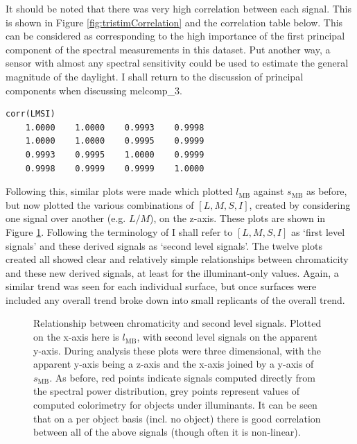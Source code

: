 It should be noted that there was very high correlation between each signal. This is shown in Figure \ref{fig:tristimCorrelation} and the correlation table below. This can be considered as corresponding to the high importance of the first principal component of the spectral measurements in this dataset. Put another way, a sensor with almost any spectral sensitivity could be used to estimate the general magnitude of the daylight. I shall return to the discussion of principal components when discussing melcomp\_3.

\begin{minipage}{\linewidth}
\begin{lstlisting}
corr(LMSI)
    1.0000    1.0000    0.9993    0.9998
    1.0000    1.0000    0.9995    0.9999
    0.9993    0.9995    1.0000    0.9999
    0.9998    0.9999    0.9999    1.0000
\end{lstlisting}
\end{minipage}

\bigskip

Following this, similar plots were made which plotted $l_{\text{MB}}$ against $s_{\text{MB}}$ as before, but now plotted the various combinations of $[L,M,S,I]$, created by considering one signal over another (e.g. $L/M$), on the z-axis. These plots are shown in Figure \ref{fig:allComboSignals}. Following the terminology of \citet{barrionuevo_contributions_2014} I shall refer to $[L,M,S,I]$ as `first level signals' and these derived signals as `second level signals'. The twelve plots created all showed clear and relatively simple relationships between chromaticity and these new derived signals, at least for the illuminant-only values. Again, a similar trend was seen for each individual surface, but once surfaces were included any overall trend broke down into small replicants of the overall trend.

\clearpage

\begin{figure}[h!]
    \caption{Relationship between chromaticity and second level signals. Plotted on the x-axis here is $l_{\text{MB}}$, with second level signals on the apparent y-axis. During analysis these plots were three dimensional, with the apparent y-axis being a z-axis and the x-axis joined by a y-axis of $s_{\text{MB}}$. As before, red points indicate signals computed directly from the spectral power distribution, grey points represent values of computed colorimetry for objects under illuminants. It can be seen that on a per object basis (incl. no object) there is good correlation between all of the above signals (though often it is non-linear).}
    \label{fig:allComboSignals}
\end{figure} 


